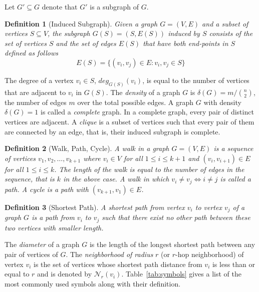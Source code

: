 \documentclass[twoside,11pt]{article}
\newtheorem{definition}{Definition}
\begin{document}
Let $G' \subseteq G$ denote that $G'$ is a subgraph of $G$.
\begin{definition}[Induced Subgraph]
    Given a graph $G=(V,E)$ and a subset of vertices $S \subseteq V$, the subgraph $G(S) = (S, E(S))$ induced by $S$ consists of the set of vertices $S$ and the set of edges $E(S)$ that have both end-points in $S$ defined as follows
    \begin{equation}
        E(S) = \{ (v_i, v_j) \in E : v_i,v_j \in S \}
    \end{equation}
\end{definition}
The degree of a vertex $v_i \in S$, $deg_{G(S)}(v_i)$, is equal to the number of vertices that are adjacent to $v_i$ in $G(S)$.
The \textit{density} of a graph $G$ is $\delta(G) = m/\binom{n}{2}$, the number of edges $m$ over the total possible edges.
A graph $G$ with density $\delta(G) = 1$ is called a \textit{complete} graph.
In a complete graph, every pair of distinct vertices are adjacent.
A \textit{clique} is a subset of vertices such that every pair of them are connected by an edge, that is, their induced subgraph is complete.
\begin{definition}[Walk, Path, Cycle]
    A walk in a graph $G=(V,E)$ is a sequence of vertices $v_1,v_2,\ldots,v_{k+1}$ where $v_i \in V$ for all $1 \le i \le k+1$ and $(v_i, v_{i+1}) \in E$ for all $1 \le i \le k$.
    The length of the walk is equal to the number of edges in the sequence, that is $k$ in the above case.
    A walk in which $v_i \ne v_j \Leftrightarrow i \ne j$ is called a path.
    A cycle is a path with $(v_{k+1}, v_1) \in E$.
\end{definition}
\begin{definition}[Shortest Path]
    A shortest path from vertex $v_i$ to vertex $v_j$ of a graph $G$ is a path from $v_i$ to $v_j$ such that there exist no other path between these two vertices with smaller length.
\end{definition}
The \textit{diameter} of a graph $G$ is the length of the longest shortest path between any pair of vertices of $G$.
The \textit{neighborhood of radius} $r$ (or $r$-hop neighborhood) of vertex $v_i$ is the set of vertices whose shortest path distance from $v_i$ is less than or equal to $r$ and is denoted
by $\mathcal{N}_r(v_i)$.
Table~\ref{tab:symbols} gives a list of the most commonly used symbols along with their definition.
\end{document}

